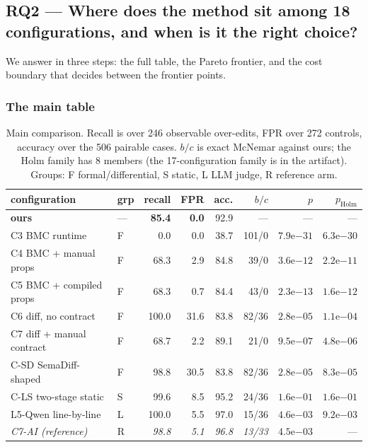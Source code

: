 \documentclass[acmsmall,screen,review,anonymous]{acmart}
\begin{document}
\subsection{RQ2 --- Where does the method sit among 18 configurations, and when is it the right choice?}
\label{sec:rq2}

We answer in three steps: the full table, the Pareto frontier, and the cost boundary that decides between the frontier points.

\subsubsection{The main table}

\begin{table}[htbp]
\centering
\scriptsize
\setlength{\tabcolsep}{3.2pt}
\begin{tabular}{@{}l l r r r r r r@{}}
\toprule
configuration & grp & recall & FPR & acc. & $b/c$ & $p$ & $p_{\mathrm{Holm}}$ \\
\midrule
\textbf{ours} & --- & \textbf{85.4} & \textbf{0.0} & 92.9 & --- & --- & --- \\
C3 BMC runtime & F & 0.0 & 0.0 & 38.7 & 101/0 & $7.9\mathrm{e}{-31}$ & $6.3\mathrm{e}{-30}$ \\
C4 BMC + manual props & F & 68.3 & 2.9 & 84.8 & 39/0 & $3.6\mathrm{e}{-12}$ & $2.2\mathrm{e}{-11}$ \\
C5 BMC + compiled props & F & 68.3 & 0.7 & 84.4 & 43/0 & $2.3\mathrm{e}{-13}$ & $1.6\mathrm{e}{-12}$ \\
C6 diff, no contract & F & 100.0 & 31.6 & 83.8 & 82/36 & $2.8\mathrm{e}{-05}$ & $1.1\mathrm{e}{-04}$ \\
C7 diff + manual contract & F & 68.7 & 2.2 & 89.1 & 21/0 & $9.5\mathrm{e}{-07}$ & $4.8\mathrm{e}{-06}$ \\
C-SD SemaDiff-shaped & F & 98.8 & 30.5 & 83.8 & 82/36 & $2.8\mathrm{e}{-05}$ & $8.3\mathrm{e}{-05}$ \\
C-LS two-stage static & S & 99.6 & 8.5 & 95.2 & 24/36 & $1.6\mathrm{e}{-01}$ & $1.6\mathrm{e}{-01}$ \\
L5-Qwen line-by-line & L & 100.0 & 5.5 & 97.0 & 15/36 & $4.6\mathrm{e}{-03}$ & $9.2\mathrm{e}{-03}$ \\
\textit{C7-AI (reference)} & R & \textit{98.8} & \textit{5.1} & \textit{96.8} & \textit{13/33} & \textit{$4.5\mathrm{e}{-03}$} & --- \\
\bottomrule
\end{tabular}
\caption{Main comparison. Recall is over 246 observable over-edits, FPR over 272 controls, accuracy over the 506 pairable cases. $b/c$ is exact McNemar against ours; the Holm family has 8 members (the 17-configuration family is in the artifact). Groups: F formal/differential, S static, L LLM judge, R reference arm.}
\label{tab:main}
\end{table}
\end{document}

